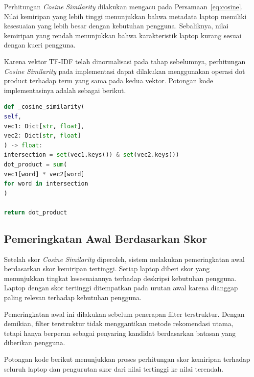Perhitungan \textit{Cosine Similarity} dilakukan mengacu pada Persamaan~\ref{eq:cosine}. Nilai kemiripan yang lebih tinggi menunjukkan bahwa metadata laptop memiliki kesesuaian yang lebih besar dengan kebutuhan pengguna. Sebaliknya, nilai kemiripan yang rendah menunjukkan bahwa karakteristik laptop kurang sesuai dengan kueri pengguna.

Karena vektor TF-IDF telah dinormalisasi pada tahap sebelumnya, perhitungan \textit{Cosine Similarity} pada implementasi dapat dilakukan menggunakan operasi dot product terhadap term yang sama pada kedua vektor. Potongan kode implementasinya adalah sebagai berikut.

\begin{lstlisting}[basicstyle=\linespread{0.8}\ttfamily\footnotesize, language=Python, breaklines=true, caption={Potongan Kode Perhitungan Cosine Similarity}, label=kode:cosine_similarity]
def _cosine_similarity(
self,
vec1: Dict[str, float],
vec2: Dict[str, float]
) -> float:
intersection = set(vec1.keys()) & set(vec2.keys())
dot_product = sum(
vec1[word] * vec2[word]
for word in intersection
)

return dot_product
\end{lstlisting}

\subsection{Pemeringkatan Awal Berdasarkan Skor}
Setelah skor \textit{Cosine Similarity} diperoleh, sistem melakukan pemeringkatan awal berdasarkan skor kemiripan tertinggi. Setiap laptop diberi skor yang menunjukkan tingkat kesesuaiannya terhadap deskripsi kebutuhan pengguna. Laptop dengan skor tertinggi ditempatkan pada urutan awal karena dianggap paling relevan terhadap kebutuhan pengguna.

Pemeringkatan awal ini dilakukan sebelum penerapan filter terstruktur. Dengan demikian, filter terstruktur tidak menggantikan metode rekomendasi utama, tetapi hanya berperan sebagai penyaring kandidat berdasarkan batasan yang diberikan pengguna.

Potongan kode berikut menunjukkan proses perhitungan skor kemiripan terhadap seluruh laptop dan pengurutan skor dari nilai tertinggi ke nilai terendah.

